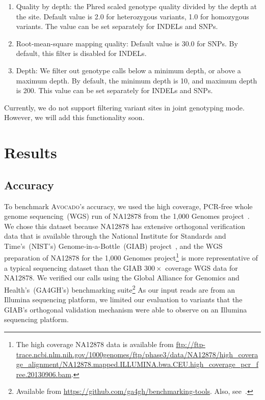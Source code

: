\documentclass{bioinfo}
\begin{document}
\begin{methods}
\begin{enumerate}
\item Quality by depth: the Phred scaled genotype quality divided by the depth at
the site. Default value is 2.0 for heterozygous variants, 1.0 for homozygous
variants. The value can be set separately for INDELs and SNPs.
\item Root-mean-square mapping quality: Default value is 30.0 for SNPs. By default,
this filter is disabled for INDELs.
\item Depth: We filter out genotype calls below a minimum depth, or above a maximum
depth. By default, the minimum depth is 10, and maximum depth is 200. This value
can be set separately for INDELs and SNPs.
\end{enumerate}

Currently, we do not support filtering variant sites in joint genotyping mode.
However, we will add this functionality soon.

\end{methods}

\section{Results}
\label{sec:results}

\subsection{Accuracy}
\label{sec:accuracy}

To benchmark \textsc{Avocado}'s accuracy, we used the high coverage, PCR-free
whole genome sequencing~(WGS) run of NA12878 from the 1,000 Genomes
project~\citep{1kg}. We chose this dataset because NA12878 has extensive
orthogonal verification data that is available through the National Institute
for Standards and Time's~(NIST's) Genome-in-a-Bottle~(GIAB)
project~\citep{zook15}, and the WGS preparation of NA12878 for the 1,000 Genomes
project\footnote{The high coverage NA12878 data is available from
\url{ftp://ftp-trace.ncbi.nlm.nih.gov/1000genomes/ftp/phase3/data/NA12878/high_coverage_alignment/NA12878.mapped.ILLUMINA.bwa.CEU.high_coverage_pcr_free.20130906.bam}.}
is more representative of a typical sequencing dataset than the GIAB $300\times$
coverage WGS data for NA12878. We verified our calls using the Global Alliance
for Genomics and Health's~(GA4GH's) benchmarking suite\footnote{Available from
\url{https://github.com/ga4gh/benchmarking-tools}. Also, see~\citet{paten15}.}
As our input reads are from an Illumina sequencing platform, we limited our
evaluation to variants that the GIAB's orthogonal validation mechanism were
able to observe on an Illumina sequencing platform.
\end{document}
